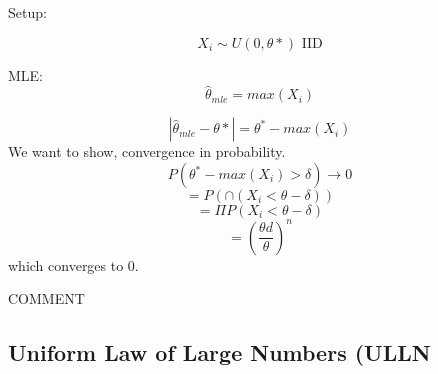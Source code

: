 \documentclass[aos,preprint]{imsart}
\numberwithin{equation}{section}
\theoremstyle{plain}
\begin{document}
Setup: 

$$ X_i \sim U(0,\theta*) \text{ IID}$$

MLE: 
$$ \hat \theta_{mle} = max(X_i) $$

$$ |\hat \theta_{mle} - \theta* | = \theta^* - max(X_i) $$
We want to show, convergence in probability. 
$$ P( \theta^* - max(X_i) >\delta) \rightarrow 0 $$
$$ = P( \cap ( X_i < \theta - \delta)) $$
$$ = \Pi P(  X_i < \theta - \delta) $$
$$ =  (\frac{\theta d}{\theta})^n$$ which converges to 0. 

COMMENT 


\subsection{Uniform Law of Large Numbers (ULLN}
\end{document}
